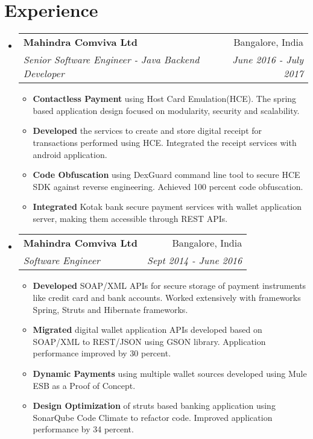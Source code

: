 \documentclass[letterpaper,11pt]{article}
\makeatletter
\newcommand{\resumeItemPlain}[2]{
  \item\small{
    \textbf{#1}{ #2 \vspace{-2pt}}
  }
}
\newcommand{\resumeSubheading}[4]{
  \vspace{-1pt}\item
    \begin{tabular*}{0.97\textwidth}{l@{\extracolsep{\fill}}r}
      \textbf{#1} & #2 \\
      \textit{\small#3} & \textit{\small #4} \\
    \end{tabular*}\vspace{-5pt}
}
\newcommand{\resumeSubHeadingListStart}{\begin{itemize}[leftmargin=*]}
\newcommand{\resumeSubHeadingListEnd}{\end{itemize}}
\newcommand{\resumeItemListStart}{\begin{itemize}}
\newcommand{\resumeItemListEnd}{\end{itemize}\vspace{-5pt}}
\makeatother
\begin{document}
\section{Experience}
  \resumeSubHeadingListStart

    \resumeSubheading
      {Mahindra Comviva Ltd}{Bangalore, India}
      {Senior Software Engineer - Java Backend Developer}{June 2016 - July 2017}
      \resumeItemListStart
        \resumeItemPlain {Contactless Payment}
          {using Host Card Emulation(HCE). The spring based application design focused on modularity, security and scalability.}
        \resumeItemPlain{Developed}
          {the services to create and store digital receipt for transactions performed using HCE. Integrated the receipt services with android application.}
        \resumeItemPlain{Code Obfuscation}
          {using DexGuard command line tool to secure HCE SDK against reverse engineering. Achieved 100 percent code obfuscation.}
        \resumeItemPlain{Integrated}
          {Kotak bank secure payment services with wallet application server, making them accessible through REST APIs. }  
      \resumeItemListEnd
      
    \resumeSubheading
      {Mahindra Comviva Ltd}{Bangalore, India}
      {Software Engineer}{Sept 2014 - June 2016}
      \resumeItemListStart
        \resumeItemPlain{Developed}
          {SOAP/XML APIs for secure storage of payment instruments like credit card and bank accounts. Worked extensively with frameworks Spring, Struts and Hibernate frameworks.}
        \resumeItemPlain{Migrated}
          {digital wallet application APIs developed based on SOAP/XML to REST/JSON using GSON library. Application performance improved by 30 percent.}
        \resumeItemPlain{Dynamic Payments}
          {using multiple wallet sources developed using Mule ESB as a Proof of Concept.}
        \resumeItemPlain{Design Optimization}
          {of struts based banking application using SonarQube Code Climate to refactor code. Improved application performance by 34 percent.}
        
      \resumeItemListEnd

  \resumeSubHeadingListEnd


\end{document}
